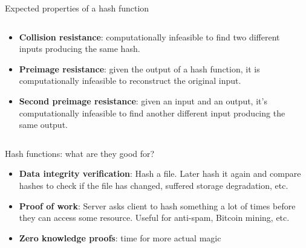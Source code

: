 \documentclass[aspectratio=169, lualatex, handout]{beamer}
\begin{document}
\begin{frame}{Expected properties of a hash function}
	\begin{columns}[c]
		\begin{column}{0.6\textwidth}
			\begin{itemize}[<+->]
				\item \textbf{Collision resistance}: computationally infeasible to find
				      two different inputs producing the same hash.
				\item \textbf{Preimage resistance}: given the output of a hash function,
				      it is computationally infeasible to reconstruct the original input.
				\item \textbf{Second preimage resistance}: given an input and an output,
				      it's computationally infeasible to find another different input
				      producing the same output.
			\end{itemize}
		\end{column}
		\begin{column}{0.4\textwidth}
		\end{column}
	\end{columns}
\end{frame}

\begin{frame}{Hash functions: what are they good for?}
	\begin{itemize}[<+->]
		\item \textbf{Data integrity verification}: Hash a file. Later hash it
		      again and compare hashes to check if the file has changed, suffered storage
		      degradation, etc.
		\item \textbf{Proof of work}: Server asks client to hash something a lot of
		      times before they can access some resource. Useful for anti-spam, Bitcoin
		      mining, etc.
		\item \textbf{Zero knowledge proofs}: time for more actual magic
	\end{itemize}
\end{frame}
\end{document}
